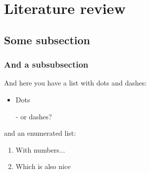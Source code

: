 
\section{Literature review}

\blindtext %

\subsection{Some subsection}
\blindtext %

\subsubsection{And a subsubsection}
\blindtext %

And here you have a list with dots and dashes:
\begin{itemize}
    \item Dots 
    \item[-] or dashes?
\end{itemize}

and an enumerated list:

\begin{enumerate}
    \item With numbers...
    \item Which is also nice \Winkey
\end{enumerate}